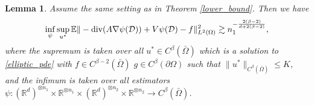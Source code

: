 \documentclass{article}
\newcommand{\R}{\mathbb{R}}
\newcommand{\E}{\mathbb{E}}
\newcommand{\D}{\mathcal{D}}
\renewcommand{\div}{\textnormal{div}}
\theoremstyle{plain}
\newtheorem{lemma}[theorem]{Lemma}
\theoremstyle{definition}
\theoremstyle{remark}
\begin{document}
\begin{lemma} \label{lower_bound_domain}
    Assume the same setting as in Theorem \ref{lower_bound}. Then we have 
    \begin{equation*}
        \inf_\psi \sup_{u^*} \E \|-\div(A \nabla \psi(\D)) + V \psi(\D) - f\|_{L^2(\Omega)}^2 \gtrsim n_1^{-\frac{2(\beta-2)}{d + 2(\beta-2)}},
    \end{equation*}
    where the supremum is taken over all $u^* \in C^\beta(\bar{\Omega})$ which is a solution to \eqref{elliptic_pde} with $f \in C^{\beta-2}(\bar{\Omega})$ $g \in C^\beta(\partial{\Omega})$ such that $\|u^*\|_{C^\beta(\bar{\Omega})} \leq K$, and the infimum is taken over all estimators $\psi: (\R^{d})^{\otimes n_1} \times \R^{\otimes n_1} \times (\R^d)^{\otimes n_2} \times \R^{\otimes n_2}\to C^\beta(\bar{\Omega})$.
\end{lemma}
\end{document}
